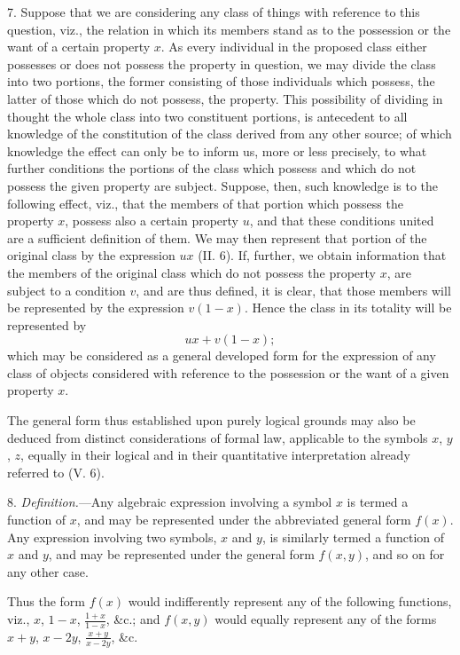 \documentclass[oneside]{book}
\begin{document}
7. Suppose that we are considering any class of things with
reference to this question, viz., the relation in which its members
stand as to the possession or the want of a certain property
$x$. As
every individual in the proposed class either possesses or does
not possess the property in question, we may divide the class
into two portions, the former consisting of those individuals
which possess, the latter of those which do not possess, the property.
This possibility of dividing in thought the whole class
into two constituent portions, is antecedent to all knowledge of
the constitution of the class derived from any other source; of
which knowledge the effect can only be to inform us, more or
less precisely, to what further conditions the portions of the class
which possess and which do not possess the given property are
subject. Suppose, then, such knowledge is to the following effect,
viz., that the members of that portion which possess the property
$x$, possess also a certain property $u$, and that these conditions
united are a sufficient definition of them. We may then represent
that portion of the original class by the expression $ux$ (II. 6).
If, further, we obtain information that the members of the original
class which do not possess the property $x$, are subject to a
condition $v$, and are thus defined, it is clear, that those members
will be represented by the expression $v \left( 1 -x \right)$. Hence the class
in its totality will be represented by
\[
ux + v \left( 1 - x \right);
\]
which may be considered as a general developed form for the
expression of any class of objects considered with reference to
the possession or the want of a given property $x$.

The general form thus established upon purely logical
grounds may also be deduced from distinct considerations of
formal law, applicable to the symbols $x$, $y$, $z$, equally in their
logical and in their quantitative interpretation already referred to
(V. 6).

8. \textit{Definition.}---Any algebraic expression involving a symbol
$x$ is termed a function of $x$, and may be represented under
the abbreviated general form $f\left(x\right)$. Any expression involving
two symbols, $x$ and $y$, is similarly termed a function of $x$ and $y$,
and may be represented under the general form $f\left(x, y\right)$, and so
on for any other case.

Thus the form $f\left(x\right)$ would indifferently represent any of the
following functions, viz., $x$, $1-x$, $\frac{1+x}{1-x}$, \&c.; and $f\left(x,y\right)$ would
equally represent any of the forms $x + y$, $x - 2y$, $\frac{x + y}{x - 2y}$, \&c.
\end{document}
